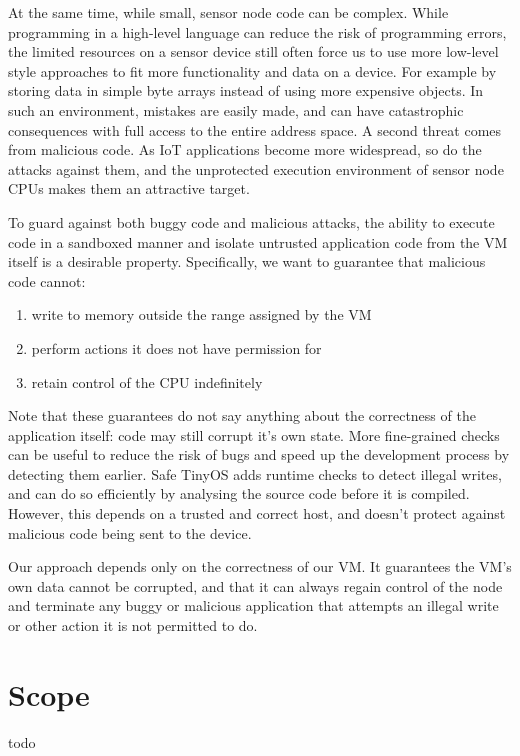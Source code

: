 At the same time, while small, sensor node code can be complex. While programming in a high-level language can reduce the risk of programming errors, the limited resources on a sensor device still often force us to use more low-level style approaches to fit more functionality and data on a device. For example by storing data in simple byte arrays instead of using more expensive objects. In such an environment, mistakes are easily made, and  can have catastrophic consequences with full access to the entire address space. A second threat comes from malicious code. As IoT applications become more widespread, so do the attacks against them, and the unprotected execution environment of sensor node CPUs makes them an attractive target.

To guard against both buggy code and malicious attacks, the ability to execute code in a sandboxed manner and isolate untrusted application code from the VM itself is a desirable property. Specifically, we want to guarantee that malicious code cannot:
\begin{enumerate}
	\item write to memory outside the range assigned by the VM
	\item perform actions it does not have permission for
	\item retain control of the CPU indefinitely
\end{enumerate}

Note that these guarantees do not say anything about the correctness of the application itself: code may still corrupt it's own state. More fine-grained checks can be useful to reduce the risk of bugs and speed up the development process by detecting them earlier. Safe TinyOS \cite{Cooprider:2007ub} adds runtime checks to detect illegal writes, and can do so efficiently by analysing the source code before it is compiled. However, this depends on a trusted and correct host, and doesn't protect against malicious code being sent to the device.

Our approach depends only on the correctness of our VM. It guarantees the VM's own data cannot be corrupted, and that it can always regain control of the node and terminate any buggy or malicious application that attempts an illegal write or other action it is not permitted to do.

\section{Scope}
todo

